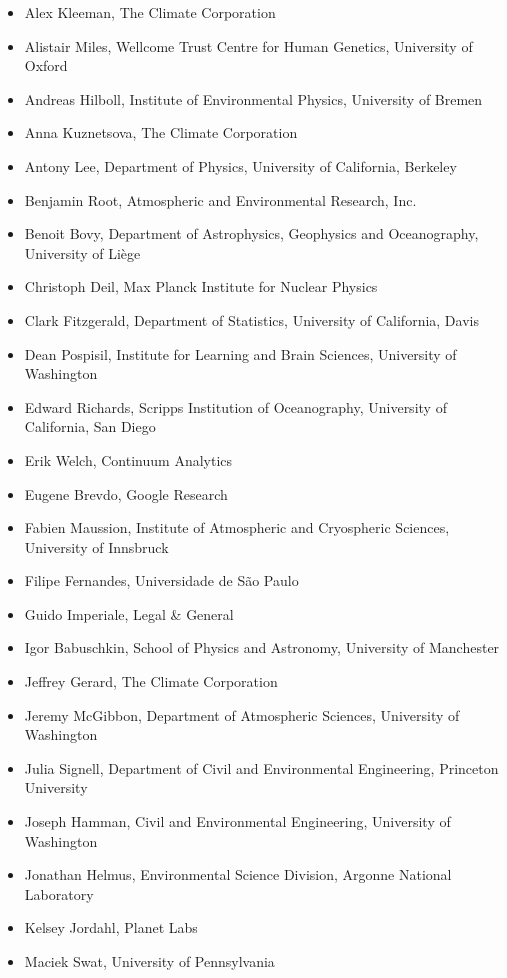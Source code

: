 \documentclass{jors}
\begin{document}
\begin{itemize}
\item Alex Kleeman, The Climate Corporation
\item Alistair Miles, Wellcome Trust Centre for Human Genetics, University of Oxford
\item Andreas Hilboll, Institute of Environmental Physics, University of Bremen
\item Anna Kuznetsova, The Climate Corporation
\item Antony Lee, Department of Physics, University of California, Berkeley
\item Benjamin Root, Atmospheric and Environmental Research, Inc.
\item Benoit Bovy, Department of Astrophysics, Geophysics and Oceanography, University of Liège
\item Christoph Deil, Max Planck Institute for Nuclear Physics
\item Clark Fitzgerald, Department of Statistics, University of California, Davis
\item Dean Pospisil, Institute for Learning and Brain Sciences, University of Washington
\item Edward Richards, Scripps Institution of Oceanography, University of California, San Diego
\item Erik Welch, Continuum Analytics
\item Eugene Brevdo, Google Research
\item Fabien Maussion, Institute of Atmospheric and Cryospheric Sciences, University of Innsbruck
\item Filipe Fernandes, Universidade de São Paulo
\item Guido Imperiale, Legal & General
\item Igor Babuschkin, School of Physics and Astronomy, University of Manchester
\item Jeffrey Gerard, The Climate Corporation
\item Jeremy McGibbon, Department of Atmospheric Sciences, University of Washington
\item Julia Signell, Department of Civil and Environmental Engineering, Princeton University
\item Joseph Hamman, Civil and Environmental Engineering, University of Washington
\item Jonathan Helmus, Environmental Science Division, Argonne National Laboratory
\item Kelsey Jordahl, Planet Labs
\item Maciek Swat, University of Pennsylvania

\end{itemize}
\end{document}
